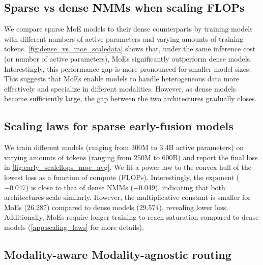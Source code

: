 \subsection{Sparse vs dense NMMs when scaling FLOPs}  
We compare sparse MoE models to their dense counterparts by training models with different numbers of active parameters and varying amounts of training tokens. \cref{fig:dense_vs_moe_scaledata} shows that, under the same inference cost (or number of active parameters), MoEs significantly outperform dense models.  
Interestingly, this performance gap is more pronounced for smaller model sizes. This suggests that MoEs enable models to handle heterogeneous data more effectively and specialize in different modalities. However, as dense models become sufficiently large, the gap between the two architectures gradually closes.


\vspace{15pt}
\subsection{Scaling laws for sparse early-fusion models}
We train different models (ranging from 300M to 3.4B active parameters) on
varying amounts of tokens (ranging from 250M to 600B) and report the final loss
in \cref{fig:early_scaleflops_moe_avg}. We fit a power law to the convex hull of
the lowest loss as a function of compute (FLOPs). Interestingly, the exponent
($-0.047$) is close to that of dense NMMs ($-0.049$), indicating that both
architectures scale similarly. However, the multiplicative constant is smaller
for MoEs ($26.287$) compared to dense models ($29.574$), revealing lower loss.
Additionally, MoEs require longer training to reach saturation compared to dense
models (\cref{app:scaling_laws} for more details). 


\subsection{Modality-aware \vs Modality-agnostic routing}

